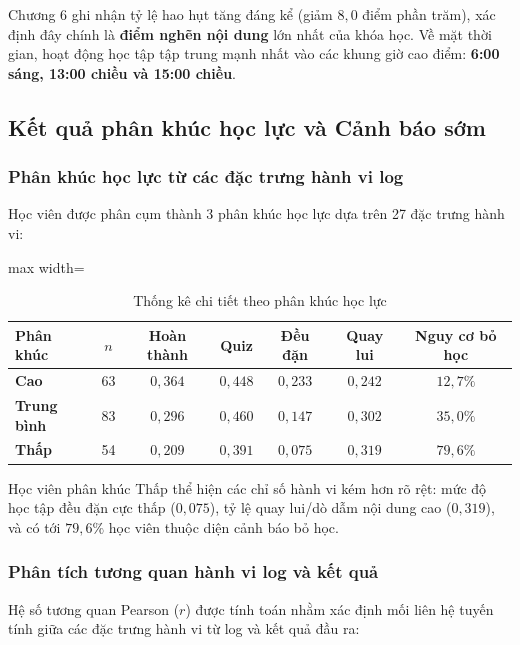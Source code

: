 Chương 6 ghi nhận tỷ lệ hao hụt tăng đáng kể (giảm $8,0$ điểm phần trăm), xác định đây chính là \textbf{điểm nghẽn nội dung} lớn nhất của khóa học. Về mặt thời gian, hoạt động học tập tập trung mạnh nhất vào các khung giờ cao điểm: \textbf{6:00 sáng, 13:00 chiều và 15:00 chiều}.

\subsection{Kết quả phân khúc học lực và Cảnh báo sớm}

\subsubsection{Phân khúc học lực từ các đặc trưng hành vi log}
Học viên được phân cụm thành 3 phân khúc học lực dựa trên 27 đặc trưng hành vi:

\begin{table}[H]
\centering
\caption{Thống kê chi tiết theo phân khúc học lực}
\label{tab:thong_ke_hoc_luc}
\begin{adjustbox}{max width=\textwidth}
\begin{tabular}{lcccccc}
\toprule
\textbf{Phân khúc} & \textbf{$n$} & \textbf{Hoàn thành} & \textbf{Quiz} & \textbf{Đều đặn} & \textbf{Quay lui} & \textbf{Nguy cơ bỏ học} \\
\midrule
\textbf{Cao} & 63 & $0,364$ & $0,448$ & $0,233$ & $0,242$ & $12,7\%$ \\
\textbf{Trung bình} & 83 & $0,296$ & $0,460$ & $0,147$ & $0,302$ & $35,0\%$ \\
\textbf{Thấp} & 54 & $0,209$ & $0,391$ & $0,075$ & $0,319$ & \textbf{$79,6\%$} \\
\bottomrule
\end{tabular}
\end{adjustbox}
\end{table}

Học viên phân khúc Thấp thể hiện các chỉ số hành vi kém hơn rõ rệt: mức độ học tập đều đặn cực thấp ($0,075$), tỷ lệ quay lui/dò dẫm nội dung cao ($0,319$), và có tới $79,6\%$ học viên thuộc diện cảnh báo bỏ học.

\subsubsection{Phân tích tương quan hành vi log và kết quả}
Hệ số tương quan Pearson ($r$) được tính toán nhằm xác định mối liên hệ tuyến tính giữa các đặc trưng hành vi từ log và kết quả đầu ra:

